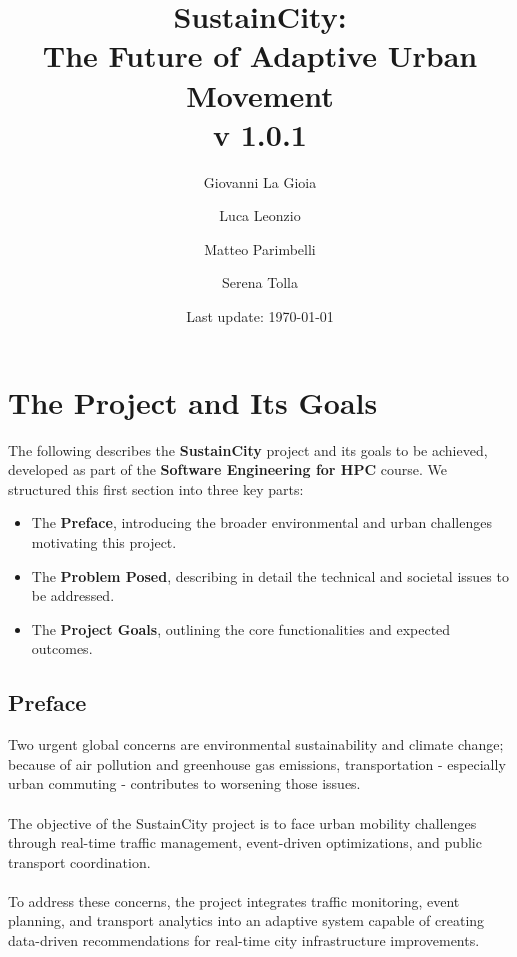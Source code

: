 \documentclass[a4paper,12pt]{article}
\title{SustainCity: \\ The Future of Adaptive Urban Movement \\ v 1.0.1} %
\author[1]{Giovanni La Gioia}
\author[2]{Luca Leonzio}
\author[3]{Matteo Parimbelli}
\author[4]{Serena Tolla}
\affil[1,2,3,4]{Politecnico di Milano}
\date{Last update: \today}
\begin{document}
\maketitle
\newpage
\tableofcontents
\clearpage
\newpage

\section{The Project and Its Goals}
The following describes the \textbf{SustainCity} project and its goals to be achieved, developed as part of the \textbf{Software Engineering for HPC} course. We structured this first section into three key parts:
\begin{itemize}
    \item The \textbf{Preface}, introducing the broader environmental and urban challenges motivating this project.
    \item The \textbf{Problem Posed}, describing in detail the technical and societal issues to be addressed.
    \item The \textbf{Project Goals}, outlining the core functionalities and expected outcomes.
\end{itemize}

\subsection*{Preface}
Two urgent global concerns are environmental sustainability and climate change; because of air pollution and greenhouse gas emissions, transportation - especially urban commuting - contributes to worsening those issues. 
\\ \\ The objective of the SustainCity project is to face urban mobility challenges through real-time traffic management, event-driven optimizations, and public transport coordination. 
\\ \\To address these concerns, the project integrates traffic monitoring, event planning, and transport analytics into an adaptive system capable of creating data-driven recommendations for real-time city infrastructure improvements.
\end{document}
